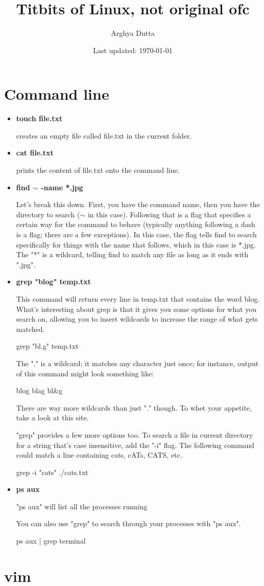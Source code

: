 \documentclass[10pt,a4paper]{article}
\title{Titbits of Linux, not original ofc}
\author{Arghya Dutta}
\date{Last updated: \today}
\begin{document}
	\maketitle
\section{Command line}
\begin{itemize}
	\item \textbf{touch file.txt}
	
	creates an empty file called file.txt in the current folder.
	\item \textbf{cat file.txt} 
	
	prints the content of file.txt onto the command line.
	\item \textbf{find $\sim$ -name *.jpg}
	
	Let's break this down. First, you have the command name, then you have the directory to search ($\sim$ in this case). Following that is a flag that specifies a certain way for the command to behave (typically anything following a dash is a flag; there are a few exceptions). In this case, the flag tells find to search specifically for things with the name that follows, which in this case is *.jpg. The "*" is a wildcard, telling find to match any file as long as it ends with ".jpg".
	
	\item 
	
	\textbf{grep "blog" temp.txt}
	
	This command will return every line in temp.txt that contains the word blog. What's interesting about grep is that it gives you some options for what you search on, allowing you to insert wildcards to increase the range of what gets matched.
	
	grep "bl.g" temp.txt
	
	The "." is a wildcard; it matches any character just once; for instance, output of this command might look something like:
	
	blog blag bl\&g
	
	There are way more wildcards than just "." though. To whet your appetite, take a look at this site.
	
	"grep" provides a few more options too. To search a file in current directory for a string that's case insensitive, add the "-i" flag. The following command could match a line containing cats, cATs, CATS, etc.
	
	grep -i "cats" ./cats.txt
	
	\item 
	 
	\textbf{ps aux}
	
	"ps aux" will list all the processes running
	
	You can also use "grep" to search through your processes with "ps aux".
	
	ps aux | grep terminal
\end{itemize}
\section{vim}
\end{document}
